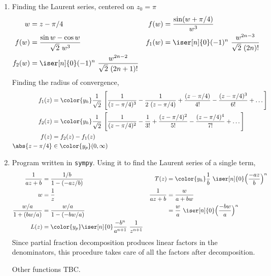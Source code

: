 \begin{enumerate}
    \item Finding the Laurent series, centered on $ z_0 = \pi $
          \begin{align}
              w      & = z - \pi/4                                                &
              f(w)   & = \frac{\sin(w + \pi/4)}{w^3}                                \\
              f(w)   & = \frac{\sin w - \cos w}{\sqrt{2}\ w^3}                    &
              f_1(w) & = \iser[n]{0} (-1)^{n}\ \frac{w^{2n-3}}{\sqrt{2}\ (2n)!}     \\
              f_2(w) & = \iser[n]{0} (-1)^{n}\ \frac{w^{2n-2}}{\sqrt{2}\ (2n+1)!}
          \end{align}
          Finding the radius of convergence,
          \begin{align}
              f_1(z)          & = \color{y_h} \frac{1}{\sqrt{2}}\
              \Bigg[\frac{1}{(z-\pi/4)^3} - \frac{1}{2\ (z - \pi/4)}
              + \frac{(z - \pi/4)}{4!} - \frac{(z - \pi/4)^3}{6!} + \dots\Bigg]   \\
              f_2(z)          & = \color{y_h} \frac{1}{\sqrt{2}}\
              \Bigg[\frac{1}{(z-\pi/4)^2} - \frac{1}{3!}
              + \frac{(z - \pi/4)^2}{5!} - \frac{(z - \pi/4)^4}{7!} + \dots\Bigg] \\
              f(z)            & = f_2(z) - f_1(z)                                 \\
              \abs{z - \pi/4} & \in \color{y_p} (0, \infty)
          \end{align}

    \item Program written in \texttt{sympy}. Using it to find the Laurent series
          of a single term,
          \begin{align}
              \frac{1}{az+b}         & = \frac{1/b}{1 - (-az/b)}                     &
              T(z)                   & = \color{y_h} \frac{1}{b}\ \iser[n]{0}
              \Big(\frac{-az}{b}\Big)^n                                                \\
              w                      & = \frac{1}{z}                                 &
              \frac{1}{az + b}       & = \frac{w}{a + bw}                              \\
              \frac{w/a}{1 + (bw/a)} & = \frac{w/a}{1 - (-bw/a)}                     &
                                     & = \frac{w}{a}\ \iser[n]{0} \Big(\frac{-bw}{a}
              \Big)^n                                                                  \\
              L(z)                   & = \color{y_p} \iser[n]{0}
              \frac{-b^n}{a^{n+1}}
              \ \frac{1}{z^{n+1}}
          \end{align}
          Since partial fraction decomposition produces linear factors in the
          denominators, this procedure takes care of all the factors after decomposition.
          \par Other functions TBC.


\end{enumerate}

